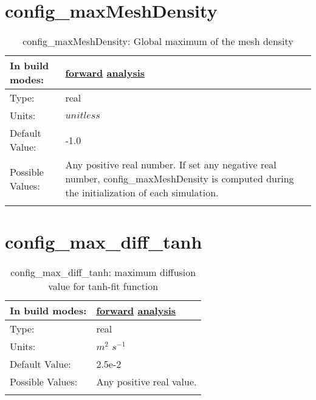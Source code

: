 \section[config\_maxMeshDensity]{config\_maxMeshDensity}
\label{sec:nm_sec_config_maxMeshDensity}
\begin{center}
\begin{longtable}{| p{2.0in} || p{4.0in} |}
    \hline
    In build modes: & \hyperref[subsec:forward_nm_tab_hmix]{forward} \hyperref[subsec:analysis_nm_tab_hmix]{analysis} \\
    \hline
    Type: & real \\
    \hline
    Units: & $unitless$ \\
    \hline
    Default Value: & -1.0 \\
    \hline
    Possible Values: & Any positive real number. If set any negative real number, config\_maxMeshDensity is computed during the initialization of each simulation. \\
    \hline
    \caption{config\_maxMeshDensity: Global maximum of the mesh density}
\end{longtable}
\end{center}
\section[config\_max\_diff\_tanh]{config\_max\_diff\_tanh}
\label{sec:nm_sec_config_max_diff_tanh}
\begin{center}
\begin{longtable}{| p{2.0in} || p{4.0in} |}
    \hline
    In build modes: & \hyperref[subsec:forward_nm_tab_vmix_tanh]{forward} \hyperref[subsec:analysis_nm_tab_vmix_tanh]{analysis} \\
    \hline
    Type: & real \\
    \hline
    Units: & $m^2$ $s^{-1}$ \\
    \hline
    Default Value: & 2.5e-2 \\
    \hline
    Possible Values: & Any positive real value. \\
    \hline
    \caption{config\_max\_diff\_tanh: maximum diffusion value for tanh-fit function}
\end{longtable}
\end{center}
